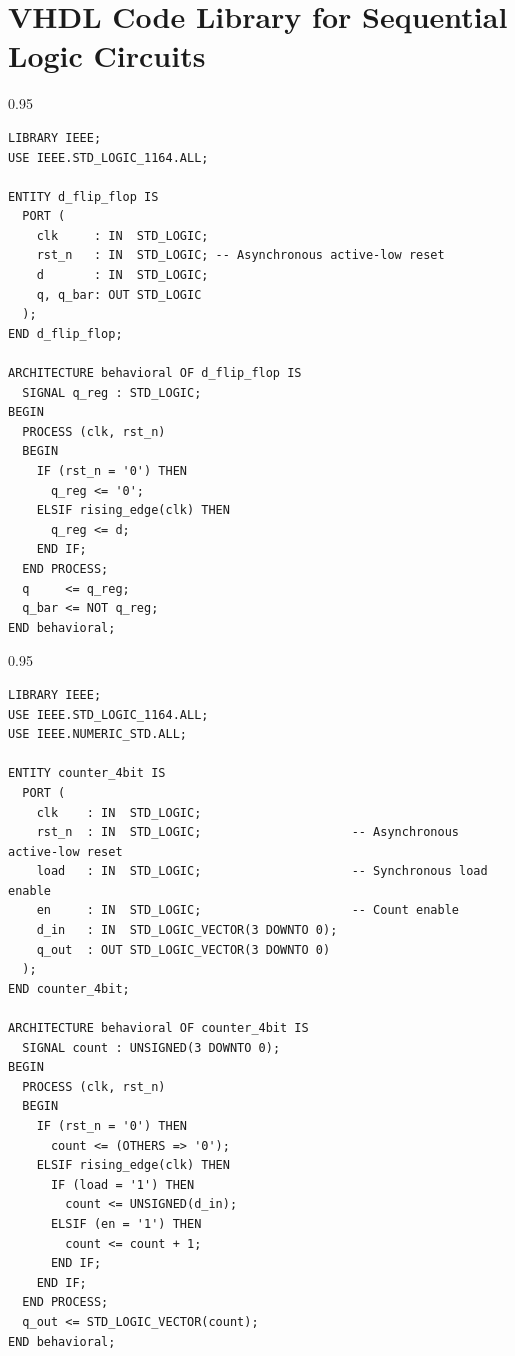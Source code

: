 \documentclass[12pt,a4paper]{article}
\begin{document}
\section{VHDL Code Library for Sequential Logic Circuits}

\begin{tcolorbox}[examplebox, title={1. D Flip-Flop with Asynchronous Active-Low Reset}]
\begin{spacing}{0.95}
\begin{verbatim}
LIBRARY IEEE;
USE IEEE.STD_LOGIC_1164.ALL;

ENTITY d_flip_flop IS
  PORT (
    clk     : IN  STD_LOGIC;
    rst_n   : IN  STD_LOGIC; -- Asynchronous active-low reset
    d       : IN  STD_LOGIC;
    q, q_bar: OUT STD_LOGIC
  );
END d_flip_flop;

ARCHITECTURE behavioral OF d_flip_flop IS
  SIGNAL q_reg : STD_LOGIC;
BEGIN
  PROCESS (clk, rst_n)
  BEGIN
    IF (rst_n = '0') THEN
      q_reg <= '0';
    ELSIF rising_edge(clk) THEN
      q_reg <= d;
    END IF;
  END PROCESS;
  q     <= q_reg;
  q_bar <= NOT q_reg;
END behavioral;
\end{verbatim}
\end{spacing}
\end{tcolorbox}

\begin{tcolorbox}[examplebox, title={2. 4-Bit Synchronous Up-Counter with Parallel Load}]
\begin{spacing}{0.95}
\begin{verbatim}
LIBRARY IEEE;
USE IEEE.STD_LOGIC_1164.ALL;
USE IEEE.NUMERIC_STD.ALL;

ENTITY counter_4bit IS
  PORT (
    clk    : IN  STD_LOGIC;
    rst_n  : IN  STD_LOGIC;                     -- Asynchronous active-low reset
    load   : IN  STD_LOGIC;                     -- Synchronous load enable
    en     : IN  STD_LOGIC;                     -- Count enable
    d_in   : IN  STD_LOGIC_VECTOR(3 DOWNTO 0);
    q_out  : OUT STD_LOGIC_VECTOR(3 DOWNTO 0)
  );
END counter_4bit;

ARCHITECTURE behavioral OF counter_4bit IS
  SIGNAL count : UNSIGNED(3 DOWNTO 0);
BEGIN
  PROCESS (clk, rst_n)
  BEGIN
    IF (rst_n = '0') THEN
      count <= (OTHERS => '0');
    ELSIF rising_edge(clk) THEN
      IF (load = '1') THEN
        count <= UNSIGNED(d_in);
      ELSIF (en = '1') THEN
        count <= count + 1;
      END IF;
    END IF;
  END PROCESS;
  q_out <= STD_LOGIC_VECTOR(count);
END behavioral;
\end{verbatim}
\end{spacing}
\end{tcolorbox}
\end{document}
